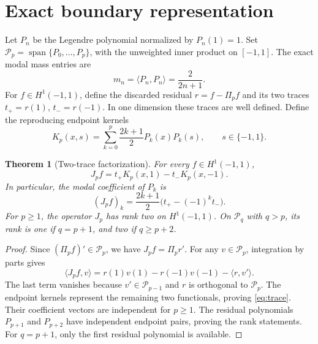 \documentclass[11pt]{article}
\newtheorem{theorem}{Theorem}
\newcommand{\PP}{\mathcal P}
\newcommand{\proj}{\Pi_p}
\newcommand{\ip}[2]{\langle #1,#2\rangle}
\begin{document}
\section{Exact boundary representation}
Let \(P_n\) be the Legendre polynomial normalized by \(P_n(1)=1\). Set \(\PP_p=\operatorname{span}\{P_0,\ldots,P_p\}\), with the unweighted inner product on \([-1,1]\). The exact modal mass entries are
\begin{equation}\label{eq:mass}
 m_n=\ip{P_n}{P_n}=\frac{2}{2n+1}.
\end{equation}
For \(f\in H^1(-1,1)\), define the discarded residual \(r=f-\proj f\) and its two traces \(t_+=r(1)\), \(t_-=r(-1)\). In one dimension these traces are well defined. Define the reproducing endpoint kernels
\begin{equation}
 K_p(x,s)=\sum_{k=0}^p\frac{2k+1}{2}P_k(x)P_k(s),\qquad s\in\{-1,1\}.
\end{equation}

\begin{theorem}[Two-trace factorization]\label{thm:trace}
For every \(f\in H^1(-1,1)\),
\begin{equation}\label{eq:trace}
 J_pf=t_+K_p(x,1)-t_-K_p(x,-1).
\end{equation}
In particular, the modal coefficient of \(P_k\) is
\begin{equation}\label{eq:coeff}
 (J_pf)_k=\frac{2k+1}{2}\bigl(t_+-(-1)^kt_-\bigr).
\end{equation}
For \(p\geq1\), the operator \(J_p\) has rank two on \(H^1(-1,1)\). On \(\PP_q\) with \(q>p\), its rank is one if \(q=p+1\), and two if \(q\geq p+2\).
\end{theorem}
\begin{proof}
Since \((\proj f)'\in\PP_p\), we have \(J_pf=\proj r'\). For any \(v\in\PP_p\), integration by parts gives
\begin{equation}
 \ip{J_pf}{v}=r(1)v(1)-r(-1)v(-1)-\ip{r}{v'}.
\end{equation}
The last term vanishes because \(v'\in\PP_{p-1}\) and \(r\) is orthogonal to \(\PP_p\). The endpoint kernels represent the remaining two functionals, proving \eqref{eq:trace}. Their coefficient vectors are independent for \(p\geq1\). The residual polynomials \(P_{p+1}\) and \(P_{p+2}\) have independent endpoint pairs, proving the rank statements. For \(q=p+1\), only the first residual polynomial is available.
\end{proof}
\end{document}
